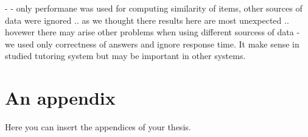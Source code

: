 \documentclass[
  digital, %
  table,   %
  nolof,     %
  nolot,     %
  nocover
]{fithesis3}
\begin{document}
-
- only performane was used for computing similarity of items, other sources of data were ignored .. as we thought there results here are most unexpected .. hovewer there may arise other problems when using different sourcess of data
- we used only correctness of answers and ignore response time. It make sense in studied tutoring system but may be important in other systems.


  \makeatletter\thesis@blocks@clear\makeatother
  \printindex

\appendix %
\chapter{An appendix}
Here you can insert the appendices of your thesis.
\end{document}
